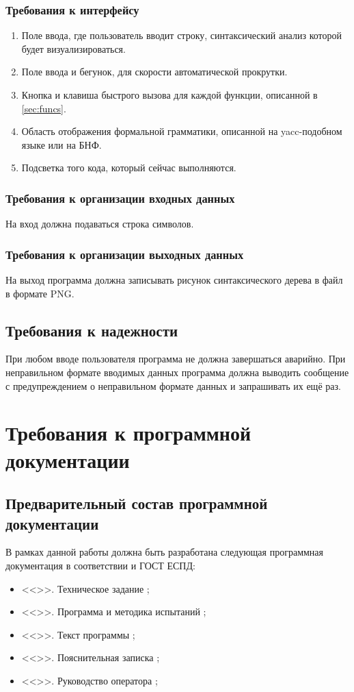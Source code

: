 \documentclass[a4paper,12pt]{article}
\begin{document}
  \subsubsection{Требования к интерфейсу}
  \begin{enumerate}
    \item Поле ввода, где пользователь вводит строку, синтаксический анализ которой будет визуализироваться.
    \item Поле ввода и бегунок, для скорости автоматической прокрутки.
    \item Кнопка и клавиша быстрого вызова для каждой функции, описанной в \autoref{sec:funcs}.
    \item Область отображения формальной грамматики, описанной на yacc-подобном языке или на БНФ.
    \item Подсветка того кода, который сейчас выполняются.
  \end{enumerate}

  \subsubsection{Требования к организации входных данных}
  На вход должна подаваться строка символов.
  \subsubsection{Требования к организации выходных данных}
  На выход программа должна записывать рисунок синтаксического дерева в файл в формате PNG.
  \subsection{Требования к надежности}
  При любом вводе пользователя программа не должна завершаться аварийно.
  При неправильном формате вводимых данных программа должна выводить сообщение с предупреждением о неправильном формате данных
  и запрашивать их ещё раз.

  \newpage
  \section{Требования к программной документации}
  \subsection{Предварительный состав программной документации}
  \label{sec:doclist}
  В рамках данной работы должна быть разработана следующая программная документация в соответствии и ГОСТ ЕСПД:
  \begin{itemize}
    \item <<\CRTname>>. Техническое задание \cite{gostTZ};
    \item <<\CRTname>>. Программа и методика испытаний \cite{gostPMI};
    \item <<\CRTname>>. Текст программы \cite{gostTP};
    \item <<\CRTname>>. Пояснительная записка \cite{gostPZ};
    \item <<\CRTname>>. Руководство оператора \cite{gostRO};
  \end{itemize}
\end{document}
